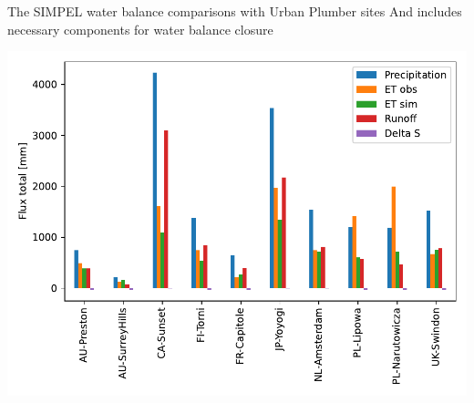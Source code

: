 \documentclass{beamer}
\begin{document}
\begin{frame}{The SIMPEL water balance comparisons with Urban Plumber sites} 
And includes necessary components for water balance closure
\begin{center}
\includegraphics[scale=0.50]{water_balance_presunangle.pdf}
\end{center}
\end{frame}
\end{document}
